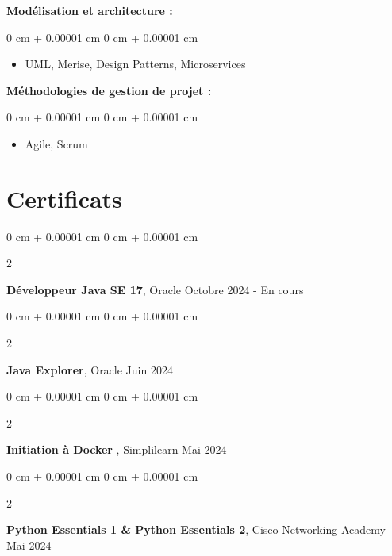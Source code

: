 \documentclass[10pt, letterpaper]{article}
\newenvironment{highlights}{
    \begin{itemize}[
        topsep=0.10 cm,
        parsep=0.10 cm,
        partopsep=0pt,
        itemsep=0pt,
        leftmargin=0 cm + 10pt
    ]
}{
    \end{itemize}
} %
\newenvironment{onecolentry}{
    \begin{adjustwidth}{
        0 cm + 0.00001 cm
    }{
        0 cm + 0.00001 cm
    }
}{
    \end{adjustwidth}
} %
\newenvironment{twocolentry}[2][]{
    \onecolentry
    \def\secondColumn{#2}
    \setcolumnwidth{\fill, 5 cm}
    \begin{paracol}{2}
}{
    \switchcolumn \raggedleft \secondColumn
    \end{paracol}
    \endonecolentry
} %
\begin{document}
		\vspace{0.7 cm}
		
		
		\textbf{Modélisation et architecture :}
		
		\vspace{0.10 cm}
		\begin{onecolentry}
			\begin{highlights}
				\item UML, Merise, Design Patterns, Microservices
			\end{highlights}
		\end{onecolentry}
		
		\vspace{0.2 cm}
		
		
		\textbf{Méthodologies de gestion de projet :}
		
		\vspace{0.10 cm}
		\begin{onecolentry}
			\begin{highlights}
				\item Agile, Scrum
			\end{highlights}
		\end{onecolentry}
		
		
		\section{Certificats}
		
		\begin{twocolentry}{
				Octobre 2024 - En cours
			}
			\textbf{Développeur Java SE 17}, Oracle\end{twocolentry}
		
		\vspace{0.3 cm}
		
		\begin{twocolentry}{
				Juin 2024
			}
			\textbf{Java Explorer}, Oracle\end{twocolentry}
		
		\vspace{0.3 cm}
		
		\begin{twocolentry}{
				Mai 2024
			}
			\textbf{Initiation à Docker }, Simplilearn\end{twocolentry}
		
		\vspace{0.3 cm}
		
		\begin{twocolentry}{
				Mai 2024
			}
			\textbf{Python Essentials 1 \& Python Essentials 2}, Cisco Networking Academy\end{twocolentry}
			
\end{document}
